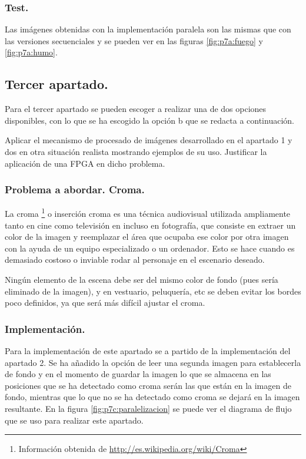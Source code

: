 \documentclass{article}
\begin{document}
\subsubsection{Test.}

	Las imágenes obtenidas con la implementación paralela son las mismas que con las versiones secuenciales y se pueden ver en las figuras \ref{fig:p7a:fuego} y \ref{fig:p7a:humo}.

\subsection{Tercer apartado.}

	Para el tercer apartado se pueden escoger a realizar una de dos opciones disponibles, con lo que se ha escogido la opción b que se redacta a continuación.
	
	Aplicar el mecanismo de procesado de imágenes desarrollado en el apartado 1 y dos en otra situación realista mostrando ejemplos de su uso. Justificar la aplicación de una FPGA en dicho problema.
	
\subsubsection{Problema a abordar. Croma.}

	La croma
\footnote{Información obtenida de \url{http://es.wikipedia.org/wiki/Croma}}	
	 o inserción croma es una técnica audiovisual utilizada ampliamente tanto en cine como televisión en incluso en fotografía, que consiste en extraer un color de la imagen y reemplazar el área que ocupaba ese color por otra imagen con la ayuda de un equipo especializado o un ordenador. Esto se hace cuando es demasiado costoso o inviable rodar al personaje en el escenario deseado.
	
	Ningún elemento de la escena debe ser del mismo color de fondo (pues sería eliminado de la imagen), y en vestuario, peluquería, etc se deben evitar los bordes poco definidos, ya que será más difícil ajustar el croma.

\subsubsection{Implementación.}

	Para la implementación de este apartado se a partido de la implementación del apartado 2. Se ha añadido la opción de leer una segunda imagen para establecerla de fondo y en el momento de guardar la imagen lo que se almacena en las posiciones que se ha detectado como croma serán las que están en la imagen de fondo, mientras que lo que no se ha detectado como croma se dejará en la imagen resultante. En la figura \ref{fig:p7c:paralelizacion} se puede ver el diagrama de flujo que se uso para realizar este apartado.
\end{document}
